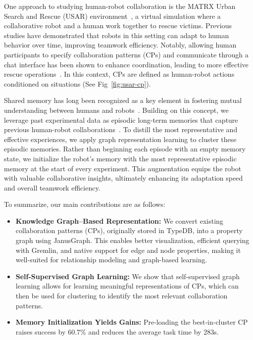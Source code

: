 \documentclass[letterpaper]{article} %
\begin{document}
One approach to studying human-robot collaboration is the MATRX Urban Search and Rescue (USAR) environment~\cite{matrx_2023,vanZoelen2021}, a virtual simulation where a collaborative robot and a human work together to rescue victims. Previous studies have demonstrated that robots in this setting can adapt to human behavior over time, improving teamwork efficiency. Notably, allowing human participants to specify collaboration patterns (CPs) and communicate through a chat interface has been shown to enhance coordination, leading to more effective rescue operations~\cite{10.1145/3434074.3446354,vanZoelen2021,vanZoelen2022}. In this context, CPs are defined as human-robot actions conditioned on situations (See Fig~\ref{fig:usar-cp}).

Shared memory has long been recognized as a key element in fostering mutual understanding between humans and robots~\cite{Miraglia2024Shared}. Building on this concept, we leverage past experimental data as episodic long-term memories that capture previous human-robot collaborations~\cite{https://doi.org/10.48550/arxiv.2204.01611,Kim_Cochez_Francois-Lavet_Neerincx_Vossen_2023}. To distill the most representative and effective experiences, we apply graph representation learning to cluster these episodic memories. Rather than beginning each episode with an empty memory state, we initialize the robot’s memory with the most representative episodic memory at the start of every experiment. This augmentation equips the robot with valuable collaborative insights, ultimately enhancing its adaptation speed and overall teamwork efficiency.

To summarize, our main contributions are as follows:

\begin{itemize}
    \item \textbf{Knowledge Graph--Based Representation:} We convert existing collaboration patterns (CPs), originally stored in TypeDB, into a property graph using JanusGraph. This enables better visualization, efficient querying with Gremlin, and native support for edge and node properties, making it well-suited for relationship modeling and graph-based learning.
    
    \item \textbf{Self-Supervised Graph Learning:} We show that self-supervised graph learning allows for learning meaningful representations of CPs, which can then be used for clustering to identify the most relevant collaboration patterns.


    \item \textbf{Memory Initialization Yields Gains:} Pre‑loading the best‑in‑cluster CP raises success by 60.7\% and reduces the average task time by 283s.
        
\end{itemize}
\end{document}
